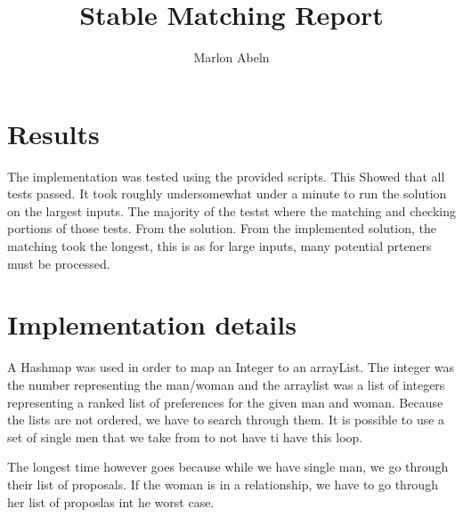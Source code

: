 \documentclass{article}
\title{Stable Matching Report}
\author{Marlon Abeln}
\begin{document}
  \maketitle

  \section{Results}


The implementation was tested using the  provided scripts. This Showed that all tests passed. It took roughly undersomewhat under a minute to run the solution on the largest inputs. The majority of the testst where the matching and checking portions of those tests. From the solution. From the implemented solution, the matching took the longest, this is as for large inputs, many potential prteners must be processed. 

  \section{Implementation details}


A Hashmap was used in order to map an Integer to an arrayList. The integer was the number representing the man/woman and the arraylist was a list of integers representing a ranked list of preferences for the given man and woman.  Because the lists are not ordered, we have to search through them. It is possible to use a set of single men that we take from to not have ti have this loop.
\par
The longest time however goes because while we have single man, we go through their list of proposals. If the woman is in a relationship, we have to go through her list of proposlas int he worst case.
\end{document}
